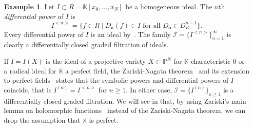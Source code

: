 \documentclass[12pt, reqno]{amsart}
\numberwithin{equation}{section}
\newcommand{\ba}{\mathbf{a}}
\renewcommand{\P}{{\mathbb P}}
\newcommand{\kk}{\mathbb{K}}
\newcommand{\cI}{{\mathcal I}}
\newcommand{\I}{{\mathcal I}}
\theoremstyle{plain} %
\theoremstyle{definition}
\newtheorem{ex}[thm]{Example}
\theoremstyle{remark}
\begin{document}
\begin{ex}\label{ex:SymbolicPowersDiffClosed}
Let $I\subset R=\kk[x_0,\ldots,x_N]$ be a homogeneous ideal.  The $n$th \textit{differential power} of $I$ is
\[
I^{<n>}=\{f\in R\mid D_\ba (f)\in I \mbox{ for all } D_\ba\in D^{n-1}_R\}.
\]
Every differential power of $I$ is an ideal by~\cite[Proposition~2.4]{DDSGHN2018}.  The family $\cI=\{I^{<n>}\}_{n=1}^\infty$ is clearly a differentially closed graded filtration of ideals.
	
If $I=I(X)$ is the ideal of a projective variety $X\subset\P^N$ for $\kk$ characteristic $0$ or a radical ideal for $\kk$ a perfect field, the Zariski-Nagata theorem~\cite{Zariski-1949,Nagata59} and its extension to perfect fields~\cite[Proposition~2.14]{DDSGHN2018} states that the symbolic powers and differential powers of $I$ coincide, that is $I^{(n)}=I^{<n>}$ for $n\ge 1$.  In either case, $\I=\{I^{(n)}\}_{n\ge 1}$ is a differentially closed graded filtration.  We will see in  that, by using Zariski's main lemma on holomorphic functions~\cite{Zariski-1949} instead of the Zariski-Nagata theorem, we can drop the assumption that $\kk$ is perfect.
\end{ex}
\end{document}
